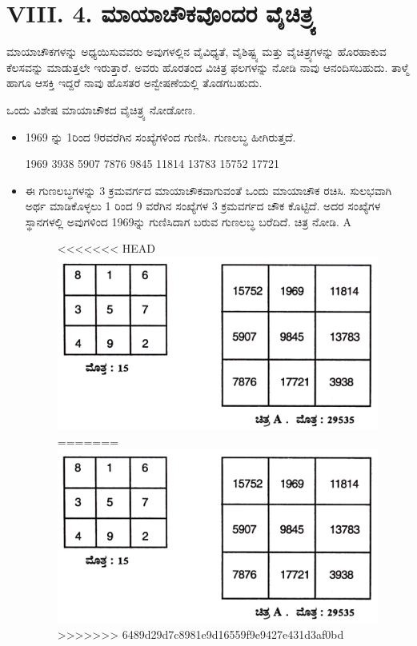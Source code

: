 \section*{VIII. 4. ಮಾಯಾಚೌಕವೊಂದರ ವೈಚಿತ್ರ್ಯ}

ಮಾಯಾಚೌಕಗಳನ್ನು ಅಧ್ಯಯಿಸುವವರು ಅವುಗಳಲ್ಲಿನ ವೈವಿಧ್ಯತೆ, ವೈಶಿಷ್ಟ್ಯ ಮತ್ತು ವೈಚಿತ್ರ್ಯಗಳನ್ನು ಹೊರಹಾಕುವ ಕೆಲಸವನ್ನು ಮಾಡುತ್ತಲೇ ಇರುತ್ತಾರೆ. ಅವರು ಹೊರತಂದ ವಿಚಿತ್ರ ಫಲಗಳನ್ನು ನೋಡಿ ನಾವು ಆನಂದಿಸಬಹುದು. ತಾಳ್ಮೆ ಹಾಗೂ ಆಸಕ್ತಿ ಇದ್ದರೆ ನಾವು ಹೊಸತರ ಅನ್ವೇಷಣೆಯಲ್ಲಿ ತೊಡಗಬಹುದು.

ಒಂದು ವಿಶೇಷ ಮಾಯಾಚೌಕದ ವೈಚಿತ್ರ್ಯ ನೋಡೋಣ.

\begin{itemize}
	\item 1969 ನ್ನು 1ರಿಂದ 9ರವರೆಗಿನ ಸಂಖ್ಯೆಗಳಿಂದ ಗುಣಿಸಿ. ಗುಣಲಬ್ಧ ಹೀಗಿರುತ್ತದೆ.

	1969 3938 5907 7876 9845 11814 13783 15752 17721
	\item ಈ ಗುಣಲಬ್ಧಗಳನ್ನು 3 ಕ್ರಮವರ್ಗದ ಮಾಯಾಚೌಕವಾಗುವಂತೆ ಒಂದು ಮಾಯಾಚೌಕ ರಚಿಸಿ. ಸುಲಭವಾಗಿ ಅರ್ಥ ಮಾಡಿಕೊಳ್ಳಲು 1 ರಿಂದ 9 ವರೆಗಿನ ಸಂಖ್ಯೆಗಳ 3 ಕ್ರಮವರ್ಗದ ಚೌಕ ಕೊಟ್ಟಿದೆ. ಅದರ ಸಂಖ್ಯೆಗಳ ಸ್ಥಾನಗಳಲ್ಲಿ ಅವುಗಳಿಂದ 1969ನ್ನು ಗುಣಿಸಿದಾಗ ಬರುವ ಗುಣಲಬ್ಧ ಬರೆದಿದೆ. ಚಿತ್ರ ನೋಡಿ. A
	\begin{figure}[H]
<<<<<<< HEAD
	\includegraphics{src/figures/chap7/fig7-8.jpg}
=======
	\includegraphics[scale=0.8]{src/figures/chap7/fig7.8.jpg}
>>>>>>> 6489d29d7c8981e9d16559f9e9427e431d3af0bd
	\end{figure}


\end{itemize}

